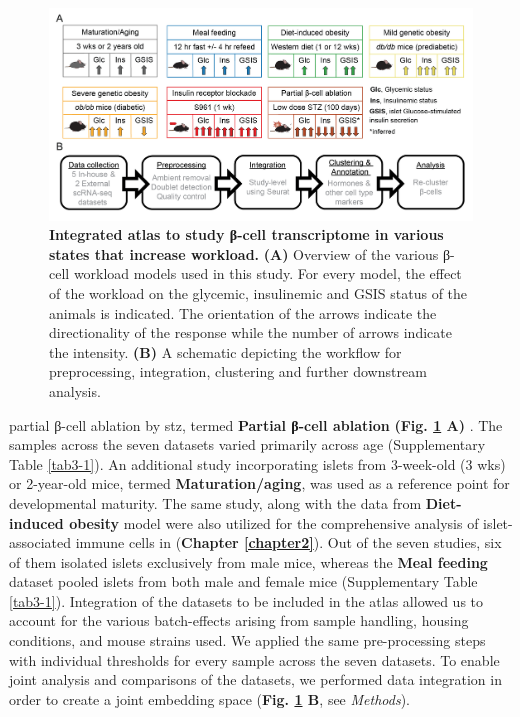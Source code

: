 \vspace{0.5cm}

\begin{figure}[H]
\centering
\includegraphics[width=\linewidth]{Chapter5/Fig/F3-1-v2-02.png}
\caption[Workflow to build an integrated atlas to study β-cell transcriptome]{\textbf{Integrated atlas to study β-cell transcriptome in various states that increase workload.} \textbf{(A)} Overview of the various β-cell workload models used in this study. For every model, the effect of the workload on the glycemic, insulinemic and GSIS status of the animals is indicated. The orientation of the arrows indicate the directionality of the response while the number of arrows indicate the intensity. \textbf{(B)} A schematic depicting the workflow for preprocessing, integration, clustering and further downstream analysis.}
\label{fig:3-1}
\end{figure}


partial β-cell ablation by \gls{stz}, termed \textbf{Partial β-cell ablation} \textbf{(Fig. \ref{fig:3-1} A)} \textbf{\cite{sachs_targeted_2020}}. The samples across the seven datasets varied primarily across age (Supplementary Table \ref{tab3-1}). An additional study incorporating islets from 3-week-old (3 wks) or 2-year-old mice, termed \textbf{Maturation/aging}, was used as a reference point for developmental maturity. The same study, along with the data from \textbf{Diet-induced obesity} model were also utilized for the comprehensive analysis of islet-associated immune cells in (\textbf{Chapter \ref{chapter2}}). Out of the seven studies, six of them isolated islets exclusively from male mice, whereas the \textbf{Meal feeding} dataset pooled islets from both male and female mice (Supplementary Table \ref{tab3-1}). Integration of the datasets to be included in the atlas allowed us to account for the various batch-effects arising from sample handling, housing conditions, and mouse strains used. We applied the same pre-processing steps with individual thresholds for every sample across the seven datasets. To enable joint analysis and comparisons of the datasets, we performed data integration in order to create a joint embedding space (\textbf{Fig. \ref{fig:3-1} B}, see \textit{Methods}).\\

